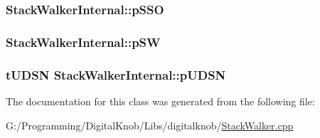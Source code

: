 \hypertarget{class_stack_walker_internal_a3a095683cbee1b58a0d0d83025eed3b5}{
\subsubsection[{p\-S\-S\-O}]{ Stack\-Walker\-Internal\-::p\-S\-S\-O}}\label{class_stack_walker_internal_a3a095683cbee1b58a0d0d83025eed3b5}
\hypertarget{class_stack_walker_internal_a1fcb0f2d6ab5d3cef0fdc774d61c18bc}{
\subsubsection[{p\-S\-W}]{ Stack\-Walker\-Internal\-::p\-S\-W}}\label{class_stack_walker_internal_a1fcb0f2d6ab5d3cef0fdc774d61c18bc}
\hypertarget{class_stack_walker_internal_ac5d1d79e77f8c449eb1aeffee3e61ce3}{
\subsubsection[{p\-U\-D\-S\-N}]{\setlength{\rightskip}{0pt plus 5cm}t\-U\-D\-S\-N Stack\-Walker\-Internal\-::p\-U\-D\-S\-N}}\label{class_stack_walker_internal_ac5d1d79e77f8c449eb1aeffee3e61ce3}


The documentation for this class was generated from the following file\-:\begin{DoxyCompactItemize}
\item 
G\-:/\-Programming/\-Digital\-Knob/\-Libs/digitalknob/\hyperlink{_stack_walker_8cpp}{Stack\-Walker.\-cpp}\end{DoxyCompactItemize}
